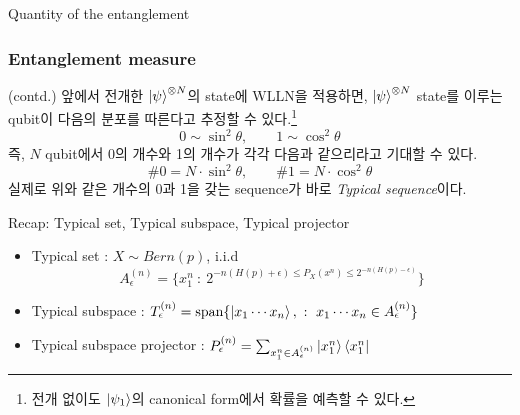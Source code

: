 \documentclass[9pt]{beamer}
\begin{document}
\begin{section}{Quantity of the entanglement}
        \begin{frame}
            \frametitle{Entanglement measure}
            (contd.) 앞에서 전개한 $\ket{\psi}^{\otimes N}$의 state에 WLLN을 적용하면, $\ket {\psi}^{\otimes N}$ state를 이루는 qubit이 다음의 분포를 따른다고 추정할 수 있다.\footnote{전개 없이도 $\ket{\psi_1}$의 canonical form에서 확률을 예측할 수 있다.}
            \begin{equation*}
                0 \sim \sin^2 \theta, \qquad 1  \sim \cos^2 \theta
            \end{equation*}
            즉, $N$ qubit에서 0의 개수와 1의 개수가 각각 다음과 같으리라고 기대할 수 있다.
            \begin{equation*}
                \# 0 = N \cdot \sin^2 \theta,\qquad \# 1 = N \cdot \cos^2 \theta
            \end{equation*}
            실제로 위와 같은 개수의 0과 1을 갖는 sequence가 바로 \textit{Typical sequence}이다.
            \begin{block}{Recap: Typical set, Typical subspace, Typical projector}
                \begin{itemize} 
                    \item Typical set : $X \sim Bern(p)$, i.i.d
                    \begin{equation*}
                        A_{\epsilon}^{(n)} = \{x_1^n \ : \ 2^{-n(H(p) + \epsilon) \le P_X(x^n) \le 2^{-n(H(p) - \epsilon)}}\}
                    \end{equation*}
                    \item Typical subspace : 
                        $ T_\epsilon^{(n)} = \text{span} \{ \ket{x_1\cdots x_n},\ : \ x_1\cdots x_n \in A_\epsilon^{(n)} \} $
                    \item Typical subspace projector : 
                        $ P_\epsilon^{(n)} = \sum_{x^n_1 \in A_\epsilon^{(n)}} \ket{x^n_1} \bra{x^n_1} $
                \end{itemize}
            \end{block}
        \end{frame}


\end{section}
\end{document}
